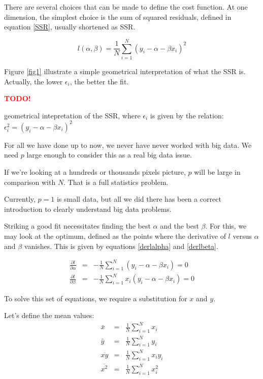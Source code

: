 \documentclass[a4paper]{tufte-book}
\newcommand{\TODO}{\textcolor{red}{\bf TODO!}\xspace}
\newcommand{\nth}{\frac{1}{N}}
\newcommand{\sumin}{\sum_{i=1}^N}
\begin{document}
There are several choices that can be made to define the cost function. At one
dimension, the simplest choice is the sum of squared residuals, defined in
equation \ref{SSR}, usually shortened as SSR.

\begin{equation}
    l(\alpha,\beta) = \nth \sumin (y_i - \alpha - \beta x_i )^2
    \label{SSR}
\end{equation} 

Figure \ref{fig1} illustrate a simple geometrical interpretation of what the SSR
is. Actually, the lower $\epsilon_i$, the better the fit.

\begin{marginfigure}
    \TODO
    \caption{geometrical intepretation of the SSR, where $\epsilon_i$ is given
        by the relation: $\epsilon_i^2 = (y_i - \alpha - \beta x_i)^2$}
    \label{fig1}
\end{marginfigure}

For all we have done up to now, we never have never worked with big data. We
need $p$ large enough to consider this as a real big data issue.

If we’re looking at a hundreds or thousands pixels picture, $p$ will be large
in comparison with $N$. That is a full statistics problem.

Currently, $p=1$ is small data, but all we did there has been a correct
introduction to clearly understand big data problems.

Striking a good fit necessitates finding the best $\alpha$ and the best $\beta$.
For this, we may look at the optimum, defined as the points where the derivative
of $l$ versus $\alpha$ and $\beta$ vanishes. This is given by equations
\ref{derlalpha} and \ref{derlbeta}.

\begin{eqnarray}
    \frac{\partial l}{\partial \alpha} & = & - \nth\sumin (y_i - \alpha - \beta x_i) = 0
    \label{derlalpha}\\
    \frac{\partial l}{\partial \beta} & =&  -\nth\sumin  x_i (y_i - \alpha -  \beta x_i) = 0
    \label{derlbeta}
\end{eqnarray}

To solve this set of equations, we require a substitution for $x$ and $y$.

Let’s define the mean values:
\begin{eqnarray}
    \bar{x} & = & \nth\sumin x_i\\
    \bar{y} & = & \frac{1}{N} \sum_{i=1}^N y_i\\
    \overline{xy} & =&  \frac{1}{N} \sum_{i=1}^{N} x_i y_i\\
    \overline{x^2} & =&  \frac{1}{N} \sum_{i=1}^N x_i^2
\end{eqnarray}
\end{document}
